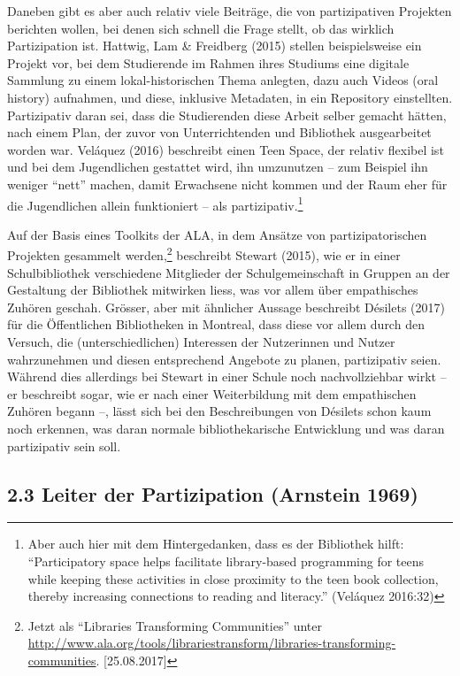 \documentclass[a4paper,
fontsize=11pt,
oneside,
numbers=noperiodatend,
parskip=half-,
bibliography=totoc,
final
]{scrartcl}
\begin{document}
Daneben gibt es aber auch relativ viele Beiträge, die von partizipativen
Projekten berichten wollen, bei denen sich schnell die Frage stellt, ob
das wirklich Partizipation ist. Hattwig, Lam \& Freidberg (2015) stellen
beispielsweise ein Projekt vor, bei dem Studierende im Rahmen ihres
Studiums eine digitale Sammlung zu einem lokal-historischen Thema
anlegten, dazu auch Videos (oral history) aufnahmen, und diese,
inklusive Metadaten, in ein Repository einstellten. Partizipativ daran
sei, dass die Studierenden diese Arbeit selber gemacht hätten, nach
einem Plan, der zuvor von Unterrichtenden und Bibliothek ausgearbeitet
worden war. Veláquez (2016) beschreibt einen Teen Space, der relativ
flexibel ist und bei dem Jugendlichen gestattet wird, ihn umzunutzen --
zum Beispiel ihn weniger \enquote{nett} machen, damit Erwachsene nicht
kommen und der Raum eher für die Jugendlichen allein funktioniert -- als
partizipativ.\footnote{Aber auch hier mit dem Hintergedanken, dass es
  der Bibliothek hilft: \enquote{Participatory space helps facilitate
  library-based programming for teens while keeping these activities in
  close proximity to the teen book collection, thereby increasing
  connections to reading and literacy.} (Veláquez 2016:32)}

Auf der Basis eines Toolkits der ALA, in dem Ansätze von
partizipatorischen Projekten gesammelt werden,\footnote{Jetzt als
  \enquote{Libraries Transforming Communities} unter
  \url{http://www.ala.org/tools/librariestransform/libraries-transforming-communities}.
  {[}25.08.2017{]}} beschreibt Stewart (2015), wie er in einer
Schulbibliothek verschiedene Mitglieder der Schulgemeinschaft in Gruppen
an der Gestaltung der Bibliothek mitwirken liess, was vor allem über
empathisches Zuhören geschah. Grösser, aber mit ähnlicher Aussage
beschreibt Désilets (2017) für die Öffentlichen Bibliotheken in
Montreal, dass diese vor allem durch den Versuch, die
(unterschiedlichen) Interessen der Nutzerinnen und Nutzer wahrzunehmen
und diesen entsprechend Angebote zu planen, partizipativ seien. Während
dies allerdings bei Stewart in einer Schule noch nachvollziehbar wirkt
-- er beschreibt sogar, wie er nach einer Weiterbildung mit dem
empathischen Zuhören begann --, lässt sich bei den Beschreibungen von
Désilets schon kaum noch erkennen, was daran normale bibliothekarische
Entwicklung und was daran partizipativ sein soll.

\hypertarget{leiter-der-partizipation-arnstein-1969}{%
\subsection{2.3 Leiter der Partizipation (Arnstein
1969)}\label{leiter-der-partizipation-arnstein-1969}}
\end{document}
